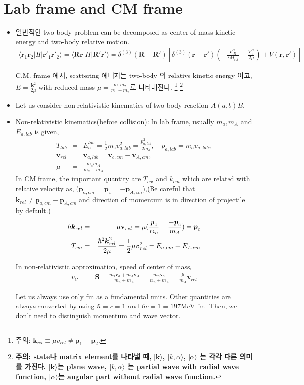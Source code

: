 \documentclass[10pt]{book}
\def\bm{\boldsymbol}
\newcommand{\bea}{\begin{eqnarray}}
\newcommand{\eea}{\end{eqnarray}}
\newcommand{\no}{\nonumber \\}
\def\vp{{\bm p}}
\def\vk{{\bm k}}
\def\vr{{\bm r}}
\def\vR{{\bm R}}
\def\la{\langle}
\def\ra{\rangle}
\begin{document}
\section{ Lab frame and CM frame}
\begin{itemize}
\item 일반적인 two-body problem can be decomposed as 
center of mass kinetic energy and two-body relative 
motion.
\bea
\la \vr_1 \vr_2|H|\vr'_1\vr'_2\ra
=\la \vR \vr|H|\vR' \vr'\ra
=\delta^{(3)}(\vR-\vR')
 \left[
 \delta^{(3)}(\vr-\vr')\left(-\frac{\nabla^2_R}{2M_{tot}}
                       -\frac{\nabla_r^2}{2\mu}\right)
 +V(\vr,\vr')\right]                      
\eea

C.M. frame 에서,
scattering 에너지는 two-body 의 relative kinetic energy 이고,
$E=\frac{\vk^2}{2\mu}$ with reduced mass 
$\mu=\frac{m_1m_2}{m_1+m_2}$로 나타내진다. 
\footnote{
주의: $\vk_{rel}\equiv \mu v_{rel} \neq \vp_1-\vp_2$.}
\footnote{
{\bf 주의: state나 matrix element를 나타낼 때,
$|\vk\ra$, $|k, \alpha\ra$, $|\alpha\ra$ 는 각각
다른 의미를 가진다. $|\vk\ra$는 plane wave, $|k,\alpha\ra$ 는
partial wave with radial wave function, $|\alpha\ra$는 
angular part without radial wave function.}
}

\item Let us consider non-relativistic kinematics of two-body reaction $A(a,b)B$.    

\item Non-relativistic kinematics(before collision):
In lab frame, usually $m_a,m_A$ and $E_{a,lab}$ is given,
\bea 
T_{lab}&=&E_a^{lab}=\frac{1}{2}m_a v_{a,lab}^2=\frac{p_{a,lab}^2}{2m_a} ,
   \quad p_{a,lab}=m_a v_{a,lab},\no 
{\bm v}_{rel}&=&{\bm v}_{a,lab}={\bm v}_{a,cm}-{\bm v}_{A,cm},\no 
\mu &=& \frac{m_a m_A}{m_a+m_A}           
\eea 
In CM frame, the important quantity are $T_{cm}$ and $k_{cm}$ which are related with relative
velocity as, ($\vp_{a,cm}=\vp_c=-\vp_{A,cm}$),(Be careful that $\vk_{rel}\neq \vp_{a,cm}-\vp_{A,cm}$ and direction of momentum is in direction of projectile by default.)
\bea 
\hbar \vk_{rel}&=& \mu{\bf v}_{rel}=\mu(\frac{\vp_c}{m_a}-\frac{-\vp_c}{m_A})=\vp_c \no 
T_{cm}&=&\frac{\hbar^2 \vk_{rel}^2 }{2\mu}=\frac{1}{2}\mu {\bm v}_{rel}^2 
       =E_{a,cm}+E_{A,cm} 
\eea 
 
In non-relativistic approximation, speed of center of mass,
\bea 
v_{G}&=&\dot{\bm S}=\frac{m_a {\bm v}_a+m_A{\bm v}_A}{m_a+m_A}
           =\frac{m_a {\bm v}_a}{m_a+m_A}=\frac{\mu}{m_A}{\bm v}_{rel}
\eea 

Let us always use only $\mbox{fm}$ as a fundamental units.
Other quantities are always converted by using
$\hbar=c=1$ and $\hbar c=1=197 \mbox{MeV}.\mbox{fm}$. Then, we don't
need to distinguish momentum and wave vector.


\end{itemize}
\end{document}
